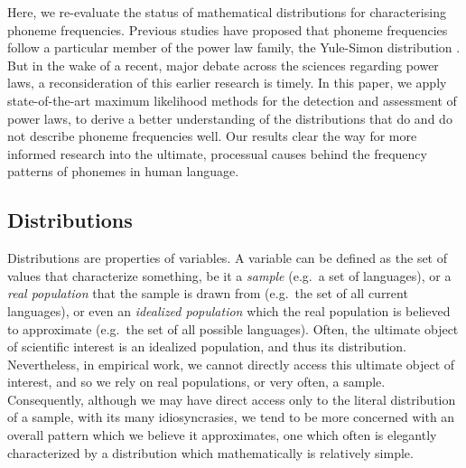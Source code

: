 Here, we re-evaluate the status of mathematical distributions for characterising phoneme frequencies. Previous studies have proposed that phoneme frequencies follow a particular member of the power law family, the Yule-Simon distribution \autocites{martindale_comparison_1996}{tambovtsev_phoneme_2007}. But in the wake of a recent, major debate across the sciences regarding power laws, a reconsideration of this earlier research is timely. In this paper, we apply state-of-the-art maximum likelihood methods for the detection and assessment of power laws, to derive a better understanding of the distributions that do and do not describe phoneme frequencies well. Our results clear the way for more informed research into the ultimate, processual causes behind the frequency patterns of phonemes in human language.

\hypertarget{distributions}{%
\subsection{Distributions}\label{distributions}}

Distributions are properties of variables. A variable can be defined as the set of values that characterize something, be it a \emph{sample} (e.g.~a set of languages), or a \emph{real population} that the sample is drawn from (e.g.~the set of all current languages), or even an \emph{idealized population} which the real population is believed to approximate (e.g.~the set of all possible languages). Often, the ultimate object of scientific interest is an idealized population, and thus its distribution. Nevertheless, in empirical work, we cannot directly access this ultimate object of interest, and so we rely on real populations, or very often, a sample. Consequently, although we may have direct access only to the literal distribution of a sample, with its many idiosyncrasies, we tend to be more concerned with an overall pattern which we believe it approximates, one which often is elegantly characterized by a distribution which mathematically is relatively simple.

